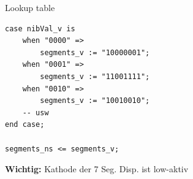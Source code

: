 \documentclass[aspectratio=169,presentation]{beamer}
\begin{document}
\begin{frame} [fragile] {Lookup table}
	\begin{lstlisting}
case nibVal_v is
	when "0000" => 
		segments_v := "10000001";
	when "0001" => 
		segments_v := "11001111";
	when "0010" => 
		segments_v := "10010010";    
	-- usw
end case;

segments_ns <= segments_v;
	\end{lstlisting}
	\textbf{Wichtig:} Kathode der 7 Seg. Disp. ist low-aktiv
\end{frame}
\end{document}
